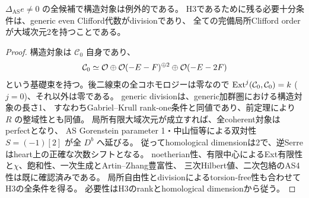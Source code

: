\begin{corollary}[構造対象の例外性と残る二条件]
\label{cor:h3-order2-conic-recognition}
$\Delta_{\mathrm{AS}}e\ne0$ の全候補で構造対象は例外的である。
H3であるために残る必要十分条件は、generic even Clifford代数がdivisionであり、
全ての完備局所Clifford orderが大域次元2を持つことである。
\end{corollary}
\begin{proof}
構造対象は $\mathcal C_0$ 自身であり、
\[
 \mathcal C_0\simeq\mathcal O\oplus\mathcal O(-E-F)^{\oplus2}\oplus\mathcal O(-E-2F)
\]
という基礎束を持つ。後二線束の全コホモロジーは零なので
$\operatorname{Ext}^j(\mathcal C_0,\mathcal C_0)=k$ ($j=0$)、それ以外は零である。
generic divisionは、generic加群圏における構造対象の長さ1、
すなわちGabriel--Krull rank-one条件と同値であり、前定理により $R$ の整域性とも同値。
局所有限大域次元が成立すれば、全coherent対象はperfectとなり、
AS Gorenstein parameter 1・中山恒等による双対性 $S=(-1)[2]$ が全 $D^b$ へ延びる。
従ってhomological dimensionは2で、逆Serreはheart上の正確な次数シフトとなる。
noetherian性、有限中心によるExt有限性と$\chi$、飽和性、一次生成とArtin--Zhang豊富性、
三次Hilbert値、二次包絡のAS4性は既に確認済みである。
局所自由性とdivisionによるtorsion-free性も合わせてH3の全条件を得る。
必要性はH3のrankとhomological dimensionから従う。
\end{proof}


